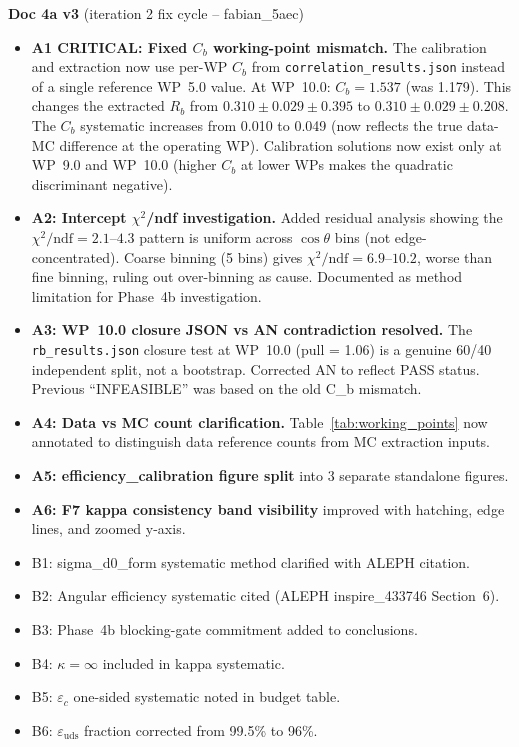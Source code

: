 \documentclass[11pt,a4paper]{article}
\begin{document}
\textbf{Doc 4a v3} (iteration 2 fix cycle -- fabian\_5aec)
\begin{itemize}
\item \textbf{A1 CRITICAL: Fixed $C_b$ working-point mismatch.} The calibration and extraction
  now use per-WP $C_b$ from \texttt{correlation\_results.json} instead of a single reference WP~5.0 value.
  At WP~10.0: $C_b = 1.537$ (was 1.179). This changes the extracted $R_b$ from
  $0.310 \pm 0.029 \pm 0.395$ to $0.310 \pm 0.029 \pm 0.208$.
  The $C_b$ systematic increases from 0.010 to 0.049 (now reflects the true data-MC difference at the operating WP).
  Calibration solutions now exist only at WP~9.0 and WP~10.0 (higher $C_b$ at lower WPs makes the
  quadratic discriminant negative).
\item \textbf{A2: Intercept $\chi^2$/ndf investigation.} Added residual analysis showing the
  $\chi^2/\mathrm{ndf} = 2.1$--$4.3$ pattern is uniform across $\cos\theta$ bins (not edge-concentrated).
  Coarse binning (5 bins) gives $\chi^2/\mathrm{ndf} = 6.9$--$10.2$, worse than fine binning,
  ruling out over-binning as cause. Documented as method limitation for Phase~4b investigation.
\item \textbf{A3: WP~10.0 closure JSON vs AN contradiction resolved.} The \texttt{rb\_results.json}
  closure test at WP~10.0 (pull = 1.06) is a genuine 60/40 independent split, not a bootstrap.
  Corrected AN to reflect PASS status. Previous ``INFEASIBLE'' was based on the old C\_b mismatch.
\item \textbf{A4: Data vs MC count clarification.} Table~\ref{tab:working_points} now annotated
  to distinguish data reference counts from MC extraction inputs.
\item \textbf{A5: efficiency\_calibration figure split} into 3 separate standalone figures.
\item \textbf{A6: F7 kappa consistency band visibility} improved with hatching, edge lines, and zoomed y-axis.
\item B1: sigma\_d0\_form systematic method clarified with ALEPH citation.
\item B2: Angular efficiency systematic cited (ALEPH inspire\_433746 Section~6).
\item B3: Phase~4b blocking-gate commitment added to conclusions.
\item B4: $\kappa = \infty$ included in kappa systematic.
\item B5: $\varepsilon_c$ one-sided systematic noted in budget table.
\item B6: $\varepsilon_\mathrm{uds}$ fraction corrected from 99.5\% to 96\%.

\end{itemize}
\end{document}
